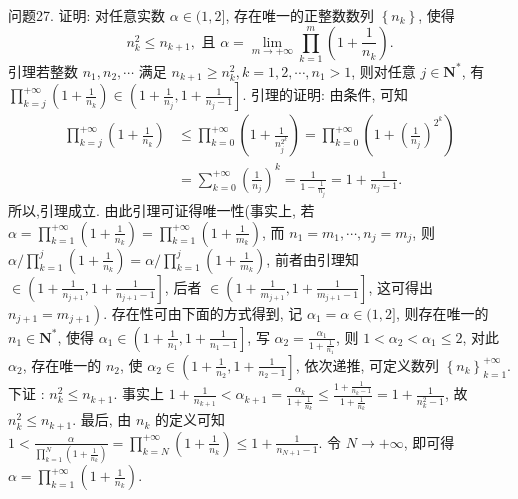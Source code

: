 问题27. 证明: 对任意实数 $\alpha \in(1,2]$, 存在唯一的正整数数列 $\left\{n_k\right\}$, 使得
$$
n_k^2 \leqslant n_{k+1}, \text { 且 } \alpha=\lim _{m \rightarrow+\infty} \prod_{k=1}^m\left(1+\frac{1}{n_k}\right) .
$$
引理若整数 $n_1, n_2, \cdots$ 满足 $n_{k+1} \geqslant n_k^2, k=1,2, \cdots, n_1>1$, 则对任意 $j \in \mathbf{N}^*$, 有 $\prod_{k=j}^{+\infty}\left(1+\frac{1}{n_k}\right) \in\left(1+\frac{1}{n_j}, 1+\frac{1}{n_j-1}\right]$. 引理的证明: 由条件, 可知
$$
\begin{aligned}
\prod_{k=j}^{+\infty}\left(1+\frac{1}{n_k}\right) & \leqslant \prod_{k=0}^{+\infty}\left(1+\frac{1}{n_j^{2^k}}\right)=\prod_{k=0}^{+\infty}\left(1+\left(\frac{1}{n_j}\right)^{2^k}\right) \\
& =\sum_{k=0}^{+\infty}\left(\frac{1}{n_j}\right)^k=\frac{1}{1-\frac{1}{n_j}}=1+\frac{1}{n_j-1} .
\end{aligned}
$$
所以,引理成立.
由此引理可证得唯一性(事实上, 若 $\alpha=\prod_{k=1}^{+\infty}\left(1+\frac{1}{n_k}\right)=\prod_{k=1}^{+\infty}\left(1+\frac{1}{m_k}\right)$, 而 $n_1=m_1, \cdots, n_j=m_j$, 则 $\alpha / \prod_{k=1}^j\left(1+\frac{1}{n_k}\right)=\alpha / \prod_{k=1}^j\left(1+\frac{1}{m_k}\right)$, 前者由引理知 $\in \left(1+\frac{1}{n_{j+1}}, 1+\frac{1}{n_{j+1}-1}\right]$, 后者 $\in\left(1+\frac{1}{m_{j+1}}, 1+\frac{1}{m_{j+1}-1}\right]$, 这可得出 $n_{j+1}= \left.m_{j+1}\right)$.
存在性可由下面的方式得到, 记 $\alpha_1=\alpha \in(1,2]$, 则存在唯一的 $n_1 \in \mathbf{N}^*$, 使得 $\alpha_1 \in\left(1+\frac{1}{n_1}, 1+\frac{1}{n_1-1}\right]$, 写 $\alpha_2=\frac{\alpha_1}{1+\frac{1}{n_1}}$, 则 $1<\alpha_2<\alpha_1 \leqslant 2$, 对此 $\alpha_2$, 存在唯一的 $n_2$, 使 $\alpha_2 \in\left(1+\frac{1}{n_2}, 1+\frac{1}{n_2-1}\right]$, 依次递推, 可定义数列 $\left\{n_k\right\}_{k=1}^{+\infty}$. 下证 : $n_k^2 \leqslant n_{k+1}$.
事实上 $1+\frac{1}{n_{k+1}}<\alpha_{k+1}=\frac{\alpha_k}{1+\frac{1}{n_k}} \leqslant \frac{1+\frac{1}{n_k-1}}{1+\frac{1}{n_k}}=1+\frac{1}{n_k^2-1}$, 故 $n_k^2 \leqslant n_{k+1}$. 最后, 由 $n_k$ 的定义可知 $1<\frac{\alpha}{\prod_{k=1}^N\left(1+\frac{1}{n_k}\right)}=\prod_{k=N}^{+\infty}\left(1+\frac{1}{n_k}\right) \leqslant 1+\frac{1}{n_{N+1}-1}$. 令 $N \rightarrow+\infty$, 即可得 $\alpha=\prod_{k=1}^{+\infty}\left(1+\frac{1}{n_k}\right)$.



